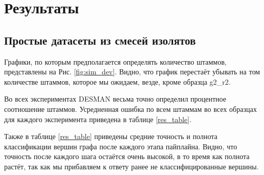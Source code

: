 \documentclass{spbau-diploma}
\begin{document}




\section{Результаты}
\subsection{Простые датасеты из смесей изолятов}
Графики, по которым предполагается определять количество штаммов, представлены на Рис. \ref{fig:sim_dev}. Видно, что график перестаёт убывать на том количестве штаммов, которое мы ожидаем, везде, кроме образца g2\_r2. 

Во всех экспериментах DESMAN весьма точно определил процентное соотношение штаммов. Усредненная ошибка по всем штаммам во всех образцах для каждого эксперимента приведена в таблице \ref{res_table}.

Также в таблице \ref{res_table} приведены средние точность и полнота классификации вершин графа после каждого этапа пайплайна. Видно, что точность после каждого шага остаётся очень высокой, в то время как полнота растёт, так как мы прибавляем к ответу ранее не классифицированные вершины.
\end{document}
